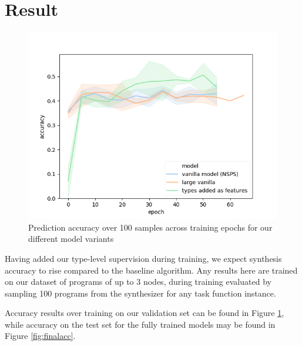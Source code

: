 \documentclass{article} %
\begin{document}

\section{Result} \label{sec:result}

\begin{figure}
    \vspace{-30pt}
    \includegraphics[scale=0.5]{figures/experiments.png}
    \vspace{-20pt}
    \caption{
        Prediction accuracy over 100 samples across training epochs for our different model variants
    }
    \label{fig:accuracy}
    \vspace{-65pt}
\end{figure}

Having added our type-level supervision during training, we expect synthesis accuracy to rise compared to the baseline algorithm.
%
Any results here are trained on our dataset of programs of up to 3 nodes,
during training evaluated by sampling 100 programs from the synthesizer for any task function instance.

Accuracy results over training on our validation set can be found in Figure \ref{fig:accuracy},
while accuracy on the test set for the fully trained models may be found in Figure \ref{fig:finalacc}.
\end{document}
